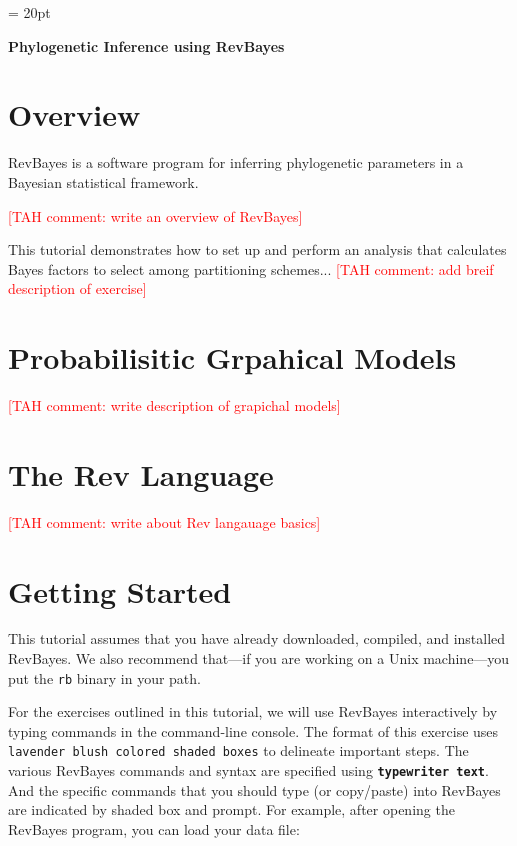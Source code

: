 \documentclass[11pt]{article}
\newcommand{\taha}[1]{{\textcolor{red}{[TAH comment: #1]}}} %
\newcommand{\cl}[1]{{\texttt{\textbf{#1}}}}
\begin{document}
\renewcommand{\headrulewidth}{0.5pt}
\headsep = 20pt
\lhead{ }

\thispagestyle{plain}
\begin{center}

\textbf{\LARGE Phylogenetic Inference using RevBayes}\\\vspace{4mm}
\end{center}

\section*{Overview}

RevBayes is a software program for inferring phylogenetic parameters in a Bayesian statistical framework. 
 
\taha{write an overview of RevBayes}

This tutorial demonstrates how to set up and perform an analysis that calculates Bayes factors to select among partitioning schemes...
\taha{add breif description of exercise}


\bigskip
\section*{Probabilisitic Grpahical Models}
\taha{write description of grapichal models}

\bigskip
\section*{The Rev Language}
\taha{write about Rev langauage basics}

\bigskip
\section*{Getting Started}

This tutorial assumes that you have already downloaded, compiled, and installed RevBayes. 
We also recommend that---if you are working on a Unix machine---you put the {\tt rb} binary in your path.

For the exercises outlined in this tutorial, we will use RevBayes interactively by typing commands in the command-line console.
The format of this exercise uses \colorbox{shadecolor}{\tt lavender blush colored shaded boxes} to delineate important steps. 
The various RevBayes commands and syntax are specified using \cl{typewriter text}. And the specific commands that you should type (or copy/paste) into RevBayes are indicated by shaded box and prompt. For example, after opening the RevBayes program, you can load your data file:
\end{document}
